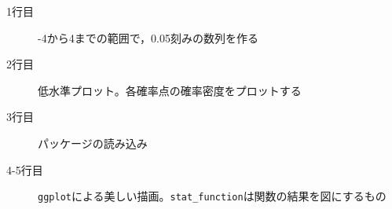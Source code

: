 \begin{description}
	\item[1行目] -4から4までの範囲で，0.05刻みの数列を作る
	\item[2行目] 低水準プロット。各確率点の確率密度をプロットする
	\item[3行目] パッケージの読み込み
	\item[4-5行目] \texttt{ggplot}による美しい描画。\verb|stat_function|は関数の結果を図にするもの
\end{description}
